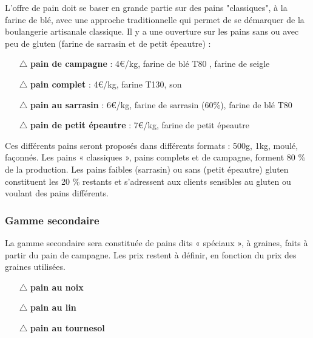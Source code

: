 \documentclass{book}
\begin{document}
L'offre de pain doit se baser en grande partie sur des pains "classiques", à la farine de blé, avec une approche traditionnelle qui permet de se démarquer de la boulangerie artisanale classique. Il y a une ouverture sur les pains sans ou avec peu de gluten (farine de sarrasin et de petit épeautre) :

\begin{itemize}

	\item[$\triangle$] \textbf{pain de campagne} : 4\euro{}/kg, farine de blé T80 , farine de seigle
	\item[$\triangle$] \textbf{pain complet} : 4\euro{}/kg, farine T130, son
	\item[$\triangle$] \textbf{pain au sarrasin} : 6\euro{}/kg, farine de sarrasin (60\%), farine de blé T80
	\item[$\triangle$] \textbf{pain de petit épeautre} : 7\euro{}/kg, farine de petit épeautre

\end{itemize}

Ces différents pains seront proposés dans différents formats : 500g, 1kg, moulé, façonnés. Les pains « classiques », pains complets et de campagne, forment 80 \% de la production. Les pains faibles (sarrasin) ou sans (petit épeautre) gluten constituent les 20 \% restants et s’adressent aux clients sensibles au gluten ou voulant des pains différents. 

\subsubsection{Gamme secondaire}

La gamme secondaire sera constituée de pains dits « spéciaux », à graines, faits à partir du pain de campagne. Les prix restent à définir, en fonction du prix des graines utilisées. 
\begin{itemize}

	\item[$\triangle$] \textbf{pain au noix}
	\item[$\triangle$] \textbf{pain au lin}
	\item[$\triangle$] \textbf{pain au tournesol}

\end{itemize}
      
\end{document}
